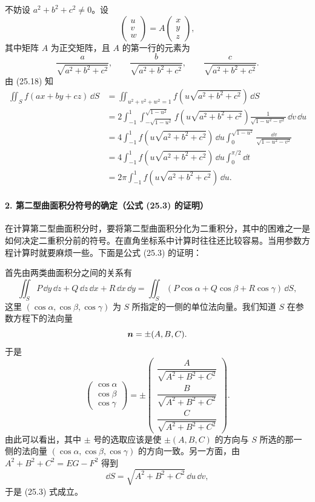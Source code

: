 \begin{xproof}
不妨设 $a^2+b^2+c^2\ne0$。设
\[
  \begin{pmatrix}u\\v\\w\end{pmatrix}
  =A\begin{pmatrix}x\\y\\z\end{pmatrix},
\]
其中矩阵 $A$ 为正交矩阵，且 $A$ 的第一行的元素为
\[
  \frac a{\sqrt{a^2+b^2+c^2}},\qquad
  \frac b{\sqrt{a^2+b^2+c^2}},\qquad
  \frac c{\sqrt{a^2+b^2+c^2}}.
\]
由 (25.18) 知
\begin{align*}
\iint_Sf(ax+by+cz)\,\dd S
&=\iint_{u^2+v^2+w^2=1}f\left(u\sqrt{a^2+b^2+c^2}\right)\,\dd S\\
&=2\int_{-1}^1\int_{-\sqrt{1-u^2}}^{\sqrt{1-u^2}}
 f\left(u\sqrt{a^2+b^2+c^2}\right)
 \frac1{\sqrt{1-u^2-v^2}}\,\dd v\,\dd u\\
&=4\int_{-1}^1 f\left(u\sqrt{a^2+b^2+c^2}\right)\,\dd u
\int_0^{\sqrt{1-u^2}}\frac{\dd v}{\sqrt{1-u^2-v^2}}\\
&=4\int_{-1}^1f\left(u\sqrt{a^2+b^2+c^2}\right)\,\dd u\int_0^{\pi/2}\dd t\\
&=2\pi\int_{-1}^1f\left(u\sqrt{a^2+b^2+c^2}\right)\,\dd u.
\end{align*}
\end{xproof}

\paragraph{2. 第二型曲面积分符号的确定（公式 (25.3) 的证明）}

在计算第二型曲面积分时，要将第二型曲面积分化为二重积分，其中的困难之一是如何决定二重积分前的符号。在直角坐标系中计算时往往还比较容易。当用参数方程计算时就要麻烦一些。下面是公式 (25.3) 的证明：

首先由两类曲面积分之间的关系有
\[
  \iint_S P\,\dd y\,\dd z+Q\,\dd z\,\dd x+R\,\dd x\,\dd y
  =\iint_S(P\cos\alpha+Q\cos\beta+R\cos\gamma)\,\dd S,
\]
这里 $(\cos\alpha,\cos\beta,\cos\gamma)$ 为 $S$ 所指定的一侧的单位法向量。我们知道 $S$ 在参数方程下的法向量
\[
  \bm{n}=\pm(A,B,C).
\]
于是
\[
  \begin{pmatrix}\cos\alpha\\\cos\beta\\\cos\gamma\end{pmatrix}
  =\pm
  \begin{pmatrix}
  \dfrac A{\sqrt{A^2+B^2+C^2}}\\[4pt]
  \dfrac B{\sqrt{A^2+B^2+C^2}}\\[4pt]
  \dfrac C{\sqrt{A^2+B^2+C^2}}
  \end{pmatrix}.
\]
由此可以看出，其中 $\pm$ 号的选取应该是使 $\pm(A,B,C)$ 的方向与 $S$ 所选的那一侧的法向量 $(\cos\alpha,\cos\beta,\cos\gamma)$ 的方向一致。另一方面，由 $A^2+B^2+C^2=EG-F^2$ 得到
\[
  \dd S=\sqrt{A^2+B^2+C^2}\,\dd u\,\dd v,
\]
于是 (25.3) 式成立。

